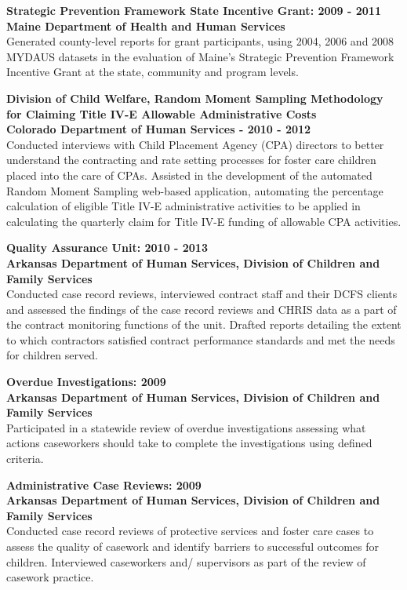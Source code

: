 \documentclass[line, mm, 10pt]{res}
\begin{document}
\begin{resume}
  {\bf Strategic Prevention Framework State Incentive Grant: 2009 - 2011} \\
  {\bf Maine Department of Health and Human Services} \\
  Generated county-level reports for grant participants, using 2004,
  2006 and 2008 MYDAUS datasets in the evaluation of Maine's Strategic
  Prevention Framework Incentive Grant at the state, community and
  program levels.

  {\bf Division of Child Welfare, Random Moment Sampling Methodology
    for Claiming Title IV-E Allowable Administrative Costs} \\
  {\bf Colorado Department of Human Services - 2010 - 2012} \\
  Conducted interviews with Child Placement Agency (CPA) directors to
  better understand the contracting and rate setting processes for
  foster care children placed into the care of CPAs. Assisted in the
  development of the automated Random Moment Sampling web-based
  application, automating the percentage calculation of eligible Title
  IV-E administrative activities to be applied in calculating the
  quarterly claim for Title IV-E funding of allowable CPA
  activities.

  {\bf Quality Assurance Unit: 2010 - 2013} \\
  {\bf Arkansas Department of Human Services, Division of Children and
    Family Services} \\
  Conducted case record reviews, interviewed contract staff and their
  DCFS clients and assessed the findings of the case record reviews
  and CHRIS data as a part of the contract monitoring functions of the
  unit. Drafted reports detailing the extent to which contractors
  satisfied contract performance standards and met the needs for
  children served.

  {\bf Overdue Investigations: 2009} \\
  {\bf Arkansas Department of Human Services, Division of Children and Family
    Services} \\
  Participated in a statewide review of overdue investigations assessing what actions
  caseworkers should take to complete the investigations using defined
  criteria.

  {\bf Administrative Case Reviews: 2009} \\
  {\bf Arkansas Department of Human Services, Division of Children and
    Family Services} \\
  Conducted case record reviews of protective services and foster care
  cases to assess the quality of casework and identify barriers to
  successful outcomes for children. Interviewed caseworkers and/
  supervisors as part of the review of casework practice.


\end{resume}
\end{document}
